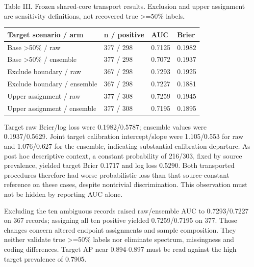 \documentclass[conference]{IEEEtran}
\begin{document}
\begin{center}\begin{minipage}{\columnwidth}\centering\footnotesize
Table III. Frozen shared-core transport results. Exclusion and upper assignment are sensitivity definitions, not recovered true >=50\% labels.\par\vspace{3pt}
\setlength{\tabcolsep}{2.5pt}
\begin{tabular}{p{}p{}p{}p{}}
\toprule
Target scenario / arm & n / positive & AUC & Brier \\
\midrule
Base >50\% / raw & 377 / 298 & 0.7125 & 0.1982 \\
Base >50\% / ensemble & 377 / 298 & 0.7072 & 0.1937 \\
Exclude boundary / raw & 367 / 298 & 0.7293 & 0.1925 \\
Exclude boundary / ensemble & 367 / 298 & 0.7227 & 0.1881 \\
Upper assignment / raw & 377 / 308 & 0.7259 & 0.1945 \\
Upper assignment / ensemble & 377 / 308 & 0.7195 & 0.1895 \\
\bottomrule
\end{tabular}
\end{minipage}\end{center}
Target raw Brier/log loss were 0.1982/0.5787; ensemble values were 0.1937/0.5629. Joint target calibration intercept/slope were 1.105/0.553 for raw and 1.076/0.627 for the ensemble, indicating substantial calibration departure. As post hoc descriptive context, a constant probability of 216/303, fixed by source prevalence, yielded target Brier 0.1717 and log loss 0.5290. Both transported procedures therefore had worse probabilistic loss than that source-constant reference on these cases, despite nontrivial discrimination. This observation must not be hidden by reporting AUC alone.

Excluding the ten ambiguous records raised raw/ensemble AUC to 0.7293/0.7227 on 367 records; assigning all ten positive yielded 0.7259/0.7195 on 377. Those changes concern altered endpoint assignments and sample composition. They neither validate true >=50\% labels nor eliminate spectrum, missingness and coding differences. Target AP near 0.894-0.897 must be read against the high target prevalence of 0.7905.
\end{document}
